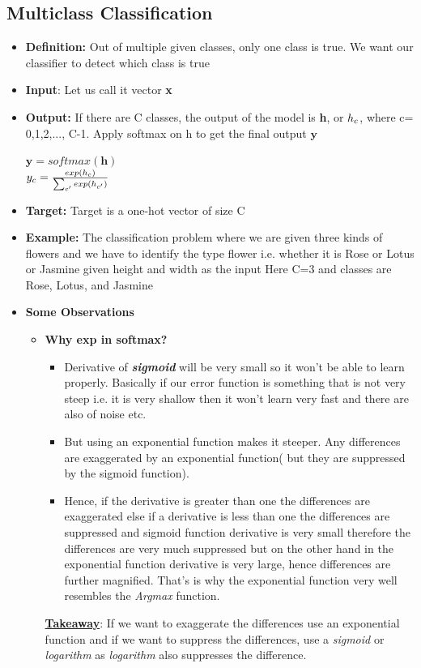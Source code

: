 \documentclass[11pt]{article}
\begin{document}
    \subsection{Multiclass Classification}
    \begin{itemize}
        \item {\textbf{Definition:}} Out of multiple given classes, only one class is true. We want our classifier to detect which class is true

\item {\textbf{Input}:} Let us call it vector \textbf{x}

\item {\textbf{Output:}} If there are C classes, the output of the model is \textbf{h}, or $h\sb{c}$, where c= 0,1,2,..., C-1.
Apply softmax on h to get the final output $\textbf{y}$
\begin{center}

$\textbf{y}=softmax(\textbf{h})$\\
\large {\bf {$y\sb{c} = \frac{exp(h\sb{c})}{\sum_{c'}exp(h\sb{c'})}$}} 
\end{center}

\item {\textbf{Target:}} Target is a one-hot vector of size C
\item {\textbf{Example:}} The classification problem where we are given three kinds of flowers and we have to identify the type flower i.e. whether it is Rose or Lotus or Jasmine given height and width as the input
Here C=3 and classes are Rose, Lotus, and Jasmine

\item{\textbf{Some Observations}}
\begin{itemize}
    \item {\bf Why exp in softmax?}
    \begin{itemize}
        \item Derivative of \textit{\bf sigmoid} will be very small so it won't be able to learn properly. Basically if our error function is something that is not very steep i.e. it is very shallow then it won't learn very fast and there are also of noise etc.
        \item But using an exponential function makes it steeper. Any differences are exaggerated by an exponential function( but they are suppressed by the sigmoid function).
        \item 
        Hence, if the derivative is greater than one the differences are exaggerated else if a derivative is less than one the differences are suppressed and sigmoid function derivative is very small therefore the differences are very much suppressed but on the other hand in the exponential function derivative is very large, hence differences are further magnified. That's is why the exponential function very well resembles the \textit{Argmax} function.
    \end{itemize}
\underline{\bf Takeaway}: If we want to exaggerate the differences use an exponential function and if we want to suppress the differences, use a \textit{sigmoid} or \textit{logarithm} as \textit{logarithm} also suppresses the difference.
\end{itemize}


\end{itemize}
\end{document}
